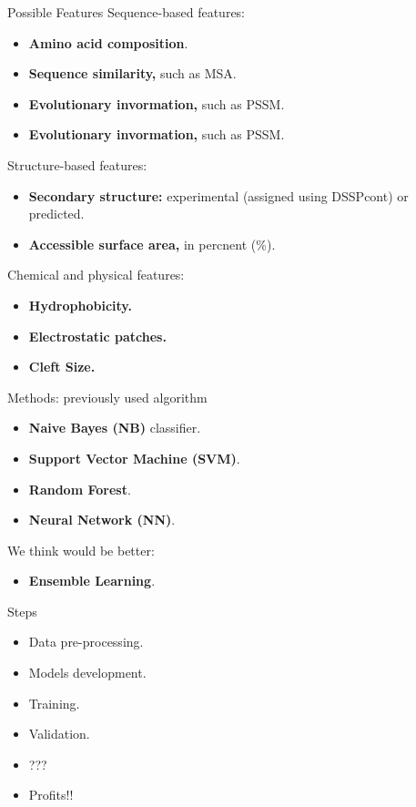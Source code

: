 \documentclass[pdf]
{beamer}
\begin{document}
\begin{frame}{Possible Features}
	Sequence-based features:
	\begin{itemize}
		\item \textbf{Amino acid composition}.
		\item \textbf{Sequence similarity,} such as MSA.
		\item \textbf{Evolutionary invormation,} such as PSSM. 
		\item \textbf{Evolutionary invormation,} such as PSSM. 
	\end{itemize}
	Structure-based features:
	\begin{itemize}
		\item \textbf{Secondary structure:} experimental (assigned using DSSPcont) or predicted.
		\item \textbf{Accessible surface area,} in percnent (\%).
	\end{itemize}
	Chemical and physical features:
	\begin{itemize}
		\item \textbf{Hydrophobicity.}
		\item \textbf{Electrostatic patches.}
		\item \textbf{Cleft Size.}
	\end{itemize}
\end{frame}

\begin{frame}{Methods: previously used algorithm}
	\begin{itemize}
		\item \textbf{Naive Bayes (NB)} classifier.
		\item \textbf{Support Vector Machine (SVM)}.
		\item \textbf{Random Forest}.
		\item \textbf{Neural Network (NN)}.
	\end{itemize}
	
	We think would be better:
	\begin{itemize}
		\item \textbf{Ensemble Learning}.
	\end{itemize}	
	
\end{frame}

\begin{frame}{Steps}

	\begin{itemize}
		\item Data pre-processing.
		\item Models development.
		\item Training.
		\item Validation.
		\item ???
		\item Profits!!
	\end{itemize}
\end{frame}
\end{document}
